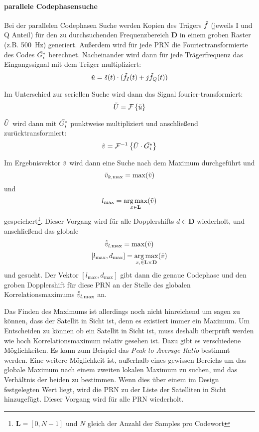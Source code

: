 \paragraph{parallele Codephasensuche}
Bei der parallelen Codephasen Suche werden Kopien des Trägers $\tilde{f}$ (jeweils I und Q Anteil) für den zu durchsuchenden Frequenzbereich $\textbf{D}$ in einem groben Raster (z.B. \SI{500}{\Hz}) generiert. Außerdem wird für jede PRN die Fouriertransformierte des Codes $\tilde{G_i^*}$ berechnet. Nacheinander wird dann für jede Trägerfrequenz das Eingangssignal mit dem Träger multipliziert:
\begin{equation}
	\tilde{u}=\tilde{s}(t) \cdot (\tilde{f}_I(t) + j \tilde{f}_Q(t))
\end{equation}

Im Unterschied zur seriellen Suche wird dann das Signal  fourier-transformiert:
\begin{equation}
	\tilde{U}=\mathcal{F}\left\{\tilde{u}\right\}
\end{equation}

$\tilde{U}$ wird dann mit $\tilde{G_i^*}$ punktweise multipliziert und anschließend zurücktransformiert: 
\begin{equation}
	\tilde{v}=\mathcal{F}^{-1}\left\{\tilde{U} \cdot \tilde{G_i^*}\right\}
\end{equation}

Im Ergebnisvektor $\tilde{v}$ wird dann eine Suche nach dem Maximum durchgeführt und 
\begin{equation}
	\tilde{v}_{k,\max}=\max(\tilde{v})
\end{equation}
und
\begin{equation}
     l_{\max}=\operatorname*{arg\,max}_{x\in \textbf{L}}(\tilde{v})
\end{equation} 
gespeichert\footnote{$\textbf{L}=[0, N-1]$ und $N$ gleich der Anzahl der Samples pro Codewort}. Dieser Vorgang wird für alle Dopplershifts $d\in \textbf{D}$ wiederholt, und anschließend das globale 
\begin{equation}
	\hat{\tilde{v}}_{l,\max}=\max(\tilde{v})
\end{equation}
\begin{equation}
	\left[l_{\max}, d_{\max}\right]=\operatorname*{arg\,max}_{x,\in \bf{L} \times \bf{D}}(\tilde{v})
\end{equation}
und gesucht. Der Vektor $\left[l_{\max}, d_{\max}\right]$ gibt dann die genaue Codephase und den groben Dopplershift für diese PRN an der Stelle des globalen Korrelationsmaximums $\hat{\tilde{v}}_{l,\max}$ an. 

Das Finden des Maximums ist allerdings noch nicht hinreichend um sagen zu können, dass der Satellit in Sicht ist, denn es existiert immer ein Maximum. Um Entscheiden zu können ob ein Satellit in Sicht ist, muss deshalb überprüft werden wie hoch Korrelationsmaximum relativ gesehen ist. Dazu gibt es verschiedene Möglichkeiten. Es kann zum Beispiel das \emph{Peak to Average Ratio} bestimmt werden. Eine weitere Möglichkeit ist, außerhalb eines gewissen Bereichs um das globale Maximum nach einem zweiten lokalen Maximum zu suchen, und das Verhältnis der beiden zu bestimmen.
Wenn dies über einem im Design festgelegten Wert liegt, wird die PRN zu der Liste der Satelliten in Sicht hinzugefügt. Dieser Vorgang wird für alle PRN wiederholt. 

